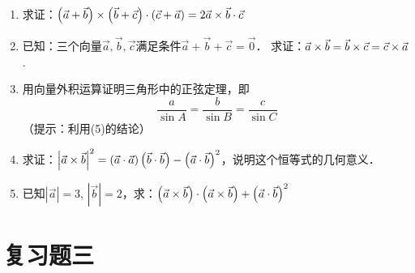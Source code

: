 \begin{enumerate}
\item 求证：$\left(\vec{a}+\vec{b}\right)\times\left(\vec{b}+\vec{c}\right)\cdot \left(\vec{c}+\vec{a}\right)=2\vec{a}\times \vec{b}\cdot \vec{c}$
\item 已知：三个向量$\vec{a},\vec{b},\vec{c}$满足条件$\vec{a}+\vec{b}+\vec{c}=\vec{0}$．
求证：$\vec{a}\times\vec{b}=\vec{b}\times\vec{c}=\vec{c}\times\vec{a}$.
\item 用向量外积运算证明三角形中的正弦定理，即
\[\frac{a}{\sin A}=\frac{b}{\sin B}=\frac{c}{\sin C}\]
（提示：利用(5)的结论）

\item 求证：$\left|\vec{a}\times \vec{b}\right|^2=\left(\vec{a}\cdot \vec{a}\right)\left(\vec{b}\cdot \vec{b}\right)-\left(\vec{a}\cdot \vec{b}\right)^2$，说明这个恒等式的几何意义．

\item 已知$|\vec{a}|=3$, $|\vec{b}|=2$，求：$\left(\vec{a}\times\vec{b}\right)\cdot \left(\vec{a}\times\vec{b}\right)+\left(\vec{a}\cdot \vec{b}\right)^2$
\end{enumerate}

\section*{复习题三}

